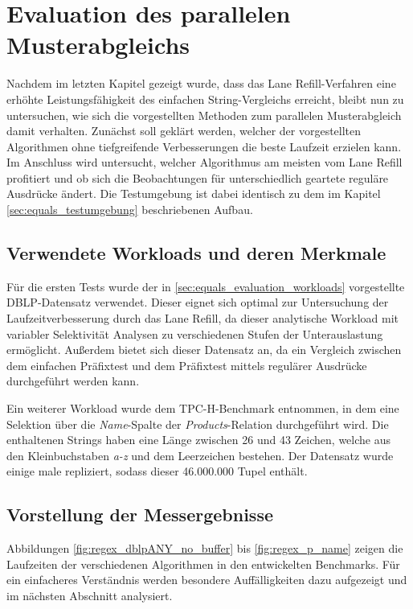 \chapter{Evaluation des parallelen Musterabgleichs}

Nachdem im letzten Kapitel gezeigt wurde, dass das Lane Refill-Verfahren eine erhöhte Leistungsfähigkeit des einfachen String-Vergleichs erreicht, bleibt nun zu untersuchen, wie sich die vorgestellten Methoden zum parallelen Musterabgleich damit verhalten.
Zunächst soll geklärt werden, welcher der vorgestellten Algorithmen ohne tiefgreifende Verbesserungen die beste Laufzeit erzielen kann.
Im Anschluss wird untersucht, welcher Algorithmus am meisten vom Lane Refill profitiert und ob sich die Beobachtungen für unterschiedlich geartete reguläre Ausdrücke ändert.
Die Testumgebung ist dabei identisch zu dem im Kapitel \ref{sec:equals_testumgebung} beschriebenen Aufbau.

\section{Verwendete Workloads und deren Merkmale}

Für die ersten Tests wurde der in \ref{sec:equals_evaluation_workloads} vorgestellte DBLP-Datensatz verwendet.
Dieser eignet sich optimal zur Untersuchung der Laufzeitverbesserung durch das Lane Refill, da dieser analytische Workload mit variabler Selektivität Analysen zu verschiedenen Stufen der Unterauslastung ermöglicht.
Außerdem bietet sich dieser Datensatz an, da ein Vergleich zwischen dem einfachen Präfixtest und dem Präfixtest mittels regulärer Ausdrücke durchgeführt werden kann.

Ein weiterer Workload wurde dem TPC-H-Benchmark entnommen, in dem eine Selektion über die \emph{Name}-Spalte der \emph{Products}-Relation durchgeführt wird.
Die enthaltenen Strings haben eine Länge zwischen 26 und 43 Zeichen, welche aus den Kleinbuchstaben \emph{a-z} und dem Leerzeichen bestehen.
Der Datensatz wurde einige male repliziert, sodass dieser 46.000.000 Tupel enthält.

\section{Vorstellung der Messergebnisse}

Abbildungen \ref{fig:regex_dblpANY_no_buffer} bis \ref{fig:regex_p_name} zeigen die Laufzeiten der verschiedenen Algorithmen in den entwickelten Benchmarks.
Für ein einfacheres Verständnis werden besondere Auffälligkeiten dazu aufgezeigt und im nächsten Abschnitt analysiert.


